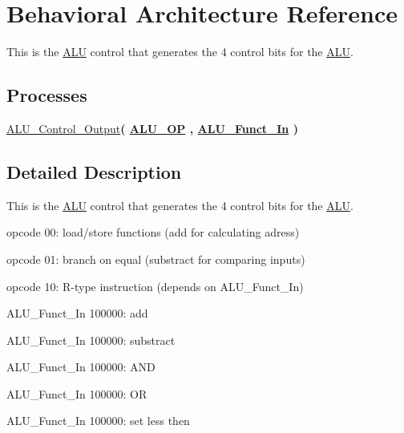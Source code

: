 \hypertarget{class_a_l_u___control_1_1_behavioral}{\section{Behavioral Architecture Reference}
\label{class_a_l_u___control_1_1_behavioral}
}


This is the \hyperlink{class_a_l_u}{A\-L\-U} control that generates the 4 control bits for the \hyperlink{class_a_l_u}{A\-L\-U}.  


\subsection*{Processes}
 \begin{DoxyCompactItemize}
\item 
\hyperlink{class_a_l_u___control_1_1_behavioral_adcbcb8b1ea56ba3295c222aa2bc5110f}{A\-L\-U\-\_\-\-Control\-\_\-\-Output}{\bfseries  ( {\bfseries {\bfseries \hyperlink{class_a_l_u___control_ab6a5d61e888c23ba77524db9a1b57d00}{A\-L\-U\-\_\-\-O\-P}} \textcolor{vhdlchar}{ }\textcolor{vhdlchar}{ }\textcolor{vhdlchar}{ }} , {\bfseries {\bfseries \hyperlink{class_a_l_u___control_a7a955f01ce8523310216d431d36b3355}{A\-L\-U\-\_\-\-Funct\-\_\-\-In}} \textcolor{vhdlchar}{ }} )}
\end{DoxyCompactItemize}


\subsection{Detailed Description}
This is the \hyperlink{class_a_l_u}{A\-L\-U} control that generates the 4 control bits for the \hyperlink{class_a_l_u}{A\-L\-U}. 

opcode 00\-: load/store functions (add for calculating adress)

opcode 01\-: branch on equal (substract for comparing inputs)

opcode 10\-: R-\/type instruction (depends on A\-L\-U\-\_\-\-Funct\-\_\-\-In)

A\-L\-U\-\_\-\-Funct\-\_\-\-In 100000\-: add

A\-L\-U\-\_\-\-Funct\-\_\-\-In 100000\-: substract

A\-L\-U\-\_\-\-Funct\-\_\-\-In 100000\-: A\-N\-D

A\-L\-U\-\_\-\-Funct\-\_\-\-In 100000\-: O\-R

A\-L\-U\-\_\-\-Funct\-\_\-\-In 100000\-: set less then 

